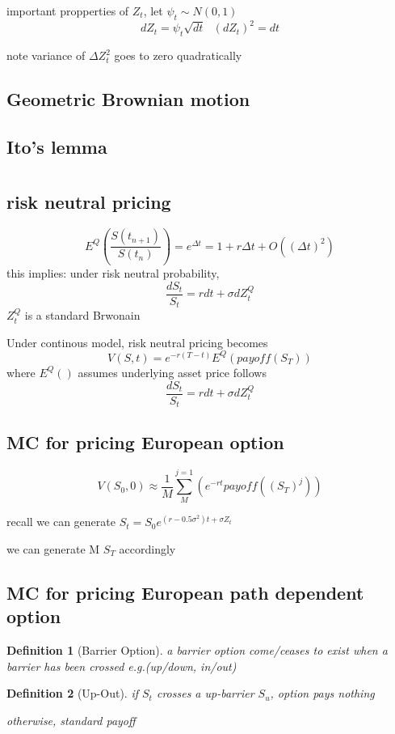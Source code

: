 \documentclass[10pt]{article}
\newcommand{\su}[2]{\sum_{#1}^{#2}}
\theoremstyle{break}
\newtheorem{defn}{Definition}[subsection]
\begin{document}
    important propperties of $Z_t$, let $\psi_t\sim N(0,1)$
    $$dZ_t=\psi_t\sqrt{dt}~~~(dZ_t)^2=dt$$

    note variance of $\Delta Z_t^2$ goes to zero quadratically
\subsection{Geometric Brownian motion}
\subsection{Ito's lemma}

\section{}
\subsection{risk neutral pricing}
    $$E^Q(\frac{S(t_{n+1})}{S(t_n)})=e^{\Delta t}=1+r\Delta t+O((\Delta t)^2)$$
    this implies: under risk neutral probability,
    $$\frac{dS_t}{S_t}=rdt+\sigma dZ_t^Q$$
    $Z_t^Q$ is a standard Brwonain

    Under continous model, risk neutral pricing becomes 
    $$V(S,t)=e^{-r(T-t)}E^Q(payoff(S_T))$$
    where $E^Q()$ assumes underlying asset price follows  
    $$\frac{dS_t}{S_t}=rdt+\sigma dZ_t^Q$$
\subsection{MC for pricing European option}
    $$V(S_0,0)\approx \frac{1}{M}\su{M}{j=1}(e^{-rt}payoff((S_T)^j))$$

    recall we can generate $S_t=S_0e^{(r-0.5\sigma^2)t+\sigma Z_t}$

    we can generate M $S_T$ accordingly
\subsection{MC for pricing European path dependent option}
    \begin{defn}[Barrier Option]
        a barrier option come/ceases to exist when a barrier has been crossed e.g.(up/down, in/out)
    \end{defn}
    \begin{defn}[Up-Out]
        if $S_t$ crosses a up-barrier $S_u$, option pays nothing

        otherwise, standard payoff
    \end{defn}
\end{document}
